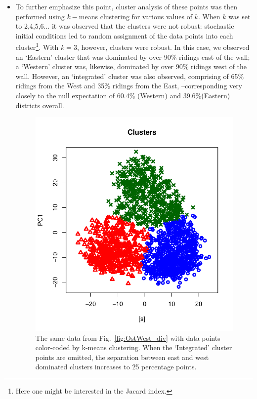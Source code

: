 \documentclass[amsmath,amssymb,nofootinbib,12pt,preprint]{revtex4}
\begin{document}
\begin{itemize}
\item To further emphasize this point, cluster analysis of these points was then performed using $k-$means clustering for various values of $k$. When $k$ was set to 2,4,5,6... it was observed that the clusters were not robust: stochastic initial conditions led to random assignment of the data points into each cluster\footnote{Here one might be interested in the Jacard index.}. With $k=3$, however, clusters were robust. In this case, we observed an `Eastern' cluster that was dominated by over 90\% ridings east of the wall; a `Western' cluster was, likewise, dominated by over 90\% ridings west of the wall. However, an `integrated' cluster was also observed, comprising of 65\% ridings from the West and 35\% ridings from the East, \---corresponding very closely to the null expectation of 60.4\% (Western) and 39.6\%(Eastern) districts overall.
\begin{figure}[t]%
\includegraphics[scale=.85]{../figures/clusters_Vote2}%
\caption{The same data from Fig.~\ref{fig:OstWest_div} with data points color-coded by k-means clustering. When the `Integrated' cluster points are omitted, the separation between east and west dominated clusters increases to 25 percentage points. } 
\label{fig:clusters}%
\end{figure}


\end{itemize}
\end{document}
